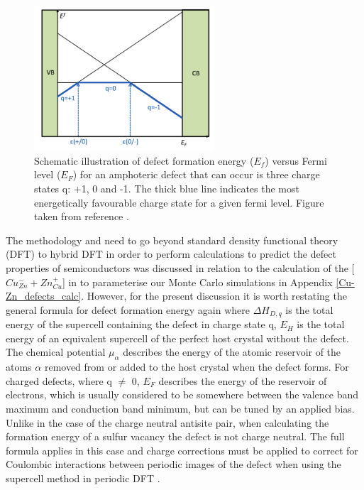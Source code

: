 \begin{figure}[h!]
  \centering
    \includegraphics[width=0.6\textwidth]{figures/defect_calc_example.png}
    \caption{Schematic illustration of defect formation energy ($E_f$) versus Fermi level ($E_F$) for an amphoteric defect that can occur is three charge states q: +1, 0 and -1. The thick blue line indicates the most energetically favourable charge state for a given fermi level. Figure taken from reference .}
  \label{defect_calc_example}
\end{figure}
The methodology and need to go beyond standard density functional theory (DFT) to hybrid DFT in order to perform calculations to predict the defect properties of semiconductors was discussed in relation to the calculation of the [$Cu_{Zn}^- + Zn_{Cu}^+$] in {\CZTS} to parameterise our Monte Carlo simulations in Appendix \ref{Cu-Zn_defects_calc}. However, for the present discussion it is worth restating the general formula for defect formation energy again where $\Delta H_{D,q}$ is the total energy of the supercell containing the defect in charge state q, $E_H$ is the total energy of an equivalent supercell of the perfect host crystal without the defect. The chemical potential $\mu_{\alpha}$ describes the energy of the atomic reservoir of the atoms $\alpha$ removed from or added to the host crystal when the defect forms. For charged defects, where q $\neq$ 0, $E_F$ describes the energy of the reservoir of electrons, which is usually considered to be somewhere between the valence band maximum and conduction band minimum, but can be tuned by an applied bias. Unlike in the case of the charge neutral antisite pair, when calculating the formation energy of a sulfur vacancy the defect is not charge neutral. The full formula applies in this case and charge corrections must be applied to correct for Coulombic interactions between periodic images of the defect when using the supercell method in periodic DFT \cite{defects_Lany}.
